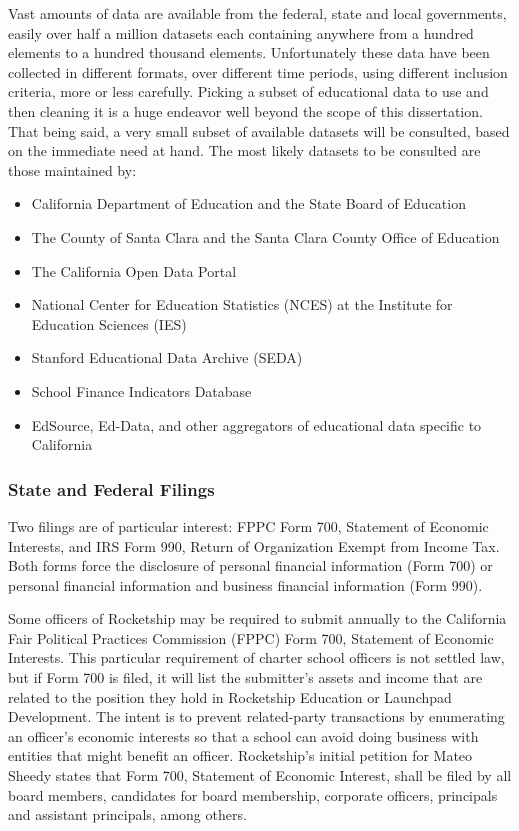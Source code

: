 Vast amounts of data are available from the federal, state and  local governments, easily over half a million datasets each containing anywhere from a hundred elements to a hundred thousand elements. Unfortunately these data have been collected in different formats, over different time periods, using different inclusion criteria, more or less carefully. Picking a subset of educational data to use and then cleaning it is a huge endeavor well beyond the scope of this dissertation. That being said, a very small subset of available datasets will be consulted, based on the immediate need at hand. The most likely datasets to be consulted are those maintained by:

\begin{itemize}
  \item California Department of Education and the State Board of Education
  \item The County of Santa Clara and the Santa Clara County Office of Education
  \item The California Open Data Portal
  \item National Center for Education Statistics (NCES) at the Institute for Education Sciences (IES)
  \item Stanford Educational Data Archive (SEDA)
  \item School Finance Indicators Database
  \item EdSource, Ed-Data, and other aggregators of educational data specific to California
\end{itemize}

\subsubsection{State and Federal Filings}\label{sec:state-federal-filings}\indent

Two filings are of particular interest: FPPC Form 700, Statement of Economic Interests, and IRS Form 990, Return of Organization Exempt from Income Tax. Both forms force the disclosure of personal financial information (Form 700) or personal financial information and business financial information (Form 990). 

Some officers of Rocketship may be required to submit annually to the California Fair Political Practices Commission (FPPC) Form 700, Statement of Economic Interests. This particular requirement of charter school officers is not settled law, but if Form 700 is filed, it will list the submitter's assets and income that are related to the position they hold in Rocketship Education or Launchpad Development. The intent is to prevent related-party transactions by enumerating an officer's economic interests so that a school can avoid doing business with entities that might benefit an officer. Rocketship's initial petition for Mateo Sheedy states that Form 700, Statement of Economic Interest, shall be filed by all board members, candidates for board membership, corporate officers, principals and assistant principals, among others. 

